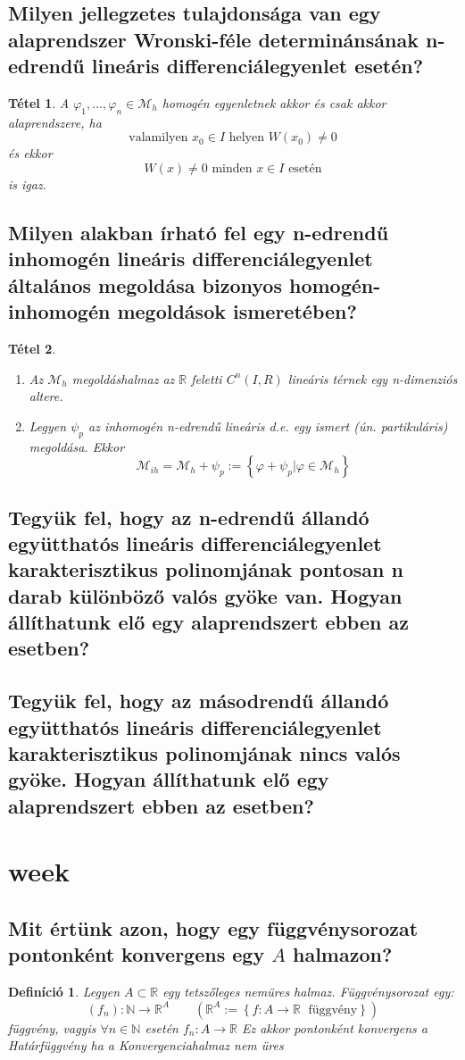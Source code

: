 \documentclass[12pt,a4paper]{article}
\newcommand{\R}{\mathbb{R}}
\newcommand{\N}{\mathbb{N}}
\newcommand{\CM}{\mathcal{M}}
\newcommand{\f}{\varphi}
\newcommand{\bb}[1]{\left( #1 \right)}
\newcommand{\braces}[1]{\left\lbrace #1 \right\rbrace}
\newtheorem{tet}{Tétel}[section]
\newtheorem{defi}{Definíció}[section]
\begin{document}
\subsection{Milyen jellegzetes tulajdonsága van egy alaprendszer Wronski-féle determinánsának n-edrendű lineáris differenciálegyenlet esetén?}
\begin{tet}
A $\f_1, \ldots , \f_n \in \CM_h$ homogén egyenletnek akkor és csak akkor alaprendszere, ha 
\[
\text{valamilyen } x_0 \in I \text{ helyen } W(x_0) \neq 0
\]
és ekkor 
\[
W(x) \neq 0 \text{ minden } x \in I \text{ esetén}
\]
is igaz.
\end{tet}

\subsection{Milyen alakban írható fel egy n-edrendű inhomogén lineáris differenciálegyenlet általános megoldása bizonyos homogén-inhomogén megoldások ismeretében?}
\begin{tet}
\begin{enumerate}
\item Az $\CM_h$ megoldáshalmaz az $\R$ feletti $C^n(I,R)$ lineáris térnek egy n-dimenziós altere.
\item Legyen $\psi_p$ az inhomogén n-edrendű lineáris d.e. egy ismert (ún. partikuláris) megoldása. Ekkor
\[
\CM_{ih} = \CM_h + \psi_p := \braces{\f+ \psi_p \vert \f \in \CM_h}
\]
\end{enumerate}
\end{tet}

\subsection{Tegyük fel, hogy az n-edrendű állandó együtthatós lineáris differenciálegyenlet karakterisztikus polinomjának pontosan n darab különböző valós gyöke van. Hogyan állíthatunk elő egy alaprendszert ebben az esetben?}

\subsection{Tegyük fel, hogy az másodrendű állandó együtthatós lineáris differenciálegyenlet karakterisztikus polinomjának nincs valós gyöke. Hogyan állíthatunk elő egy alaprendszert ebben az esetben?}
\newpage
\section{week}
\subsection{Mit értünk azon, hogy egy függvénysorozat pontonként konvergens egy $A$ halmazon?}
\begin{defi}
Legyen $A \subset \R$ egy tetszőleges nemüres halmaz.
Függvénysorozat egy:
\[
\bb{f_n} : \N \to \R^A \quad \quad \bb{\R^A:= \braces{f:A\to \R \;\text{ függvény}}}
\]
függvény, vagyis $\forall n \in \N$ esetén $f_n: A \to \R$
Ez akkor pontonként konvergens a Határfüggvény ha a Konvergenciahalmaz nem üres
\end{defi}
\end{document}
